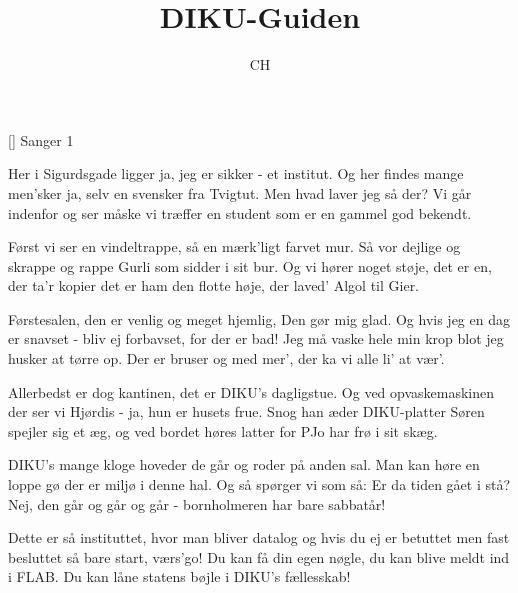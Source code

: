 \documentclass[a4paper,11pt]{article}
\title{DIKU-Guiden}
\author{CH}
\begin{document}
\maketitle

\begin{roles}
[] Sanger 1
\end{roles}

\begin{song}
%
Her i Sigurdsgade ligger
ja, jeg er sikker - 
et institut.
Og her findes mange men'sker
ja, selv en svensker
fra Tvigtut.
Men hvad laver jeg så der?
Vi går indenfor og ser
måske vi træffer en student
som er en gammel god bekendt.

%
Først vi ser en vindeltrappe,
så en mærk'ligt farvet mur.
Så vor dejlige og skrappe
og rappe Gurli
som sidder i sit bur.
Og vi hører noget støje,
det er en, der ta'r kopier
det er ham den flotte høje,
der laved' Algol til Gier.

%
Førstesalen, den er venlig
og meget hjemlig,
Den gør mig glad.
Og hvis jeg en dag er snavset - 
bliv ej forbavset,
for der er bad!
Jeg må vaske hele min krop
blot jeg husker at tørre op.
Der er bruser og med mer',
der ka vi alle li' at vær'.

%
Allerbedst er dog kantinen,
det er DIKU's dagligstue.
Og ved opvaskemaskinen
der ser vi Hjørdis - 
ja, hun er husets frue.
Snog han æder DIKU-platter
Søren spejler sig et æg,
og ved bordet høres latter
for PJo har frø i sit skæg.

%
DIKU's mange kloge hoveder
de går og roder
på anden sal.
Man kan høre en loppe gø
der er miljø
i denne hal.
Og så spørger vi som så:
Er da tiden gået i stå?
Nej, den går og går og går - 
bornholmeren har bare sabbatår!

%
Dette er så instituttet,
hvor man bliver datalog
og hvis du ej er betuttet
men fast besluttet
så bare start, værs'go!
Du kan få din egen nøgle,
du kan blive meldt ind i FLAB.
Du kan låne statens bøjle
i DIKU's fællesskab! 
\end{song}
\end{document}
